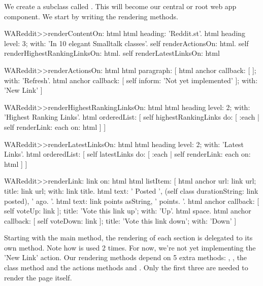 \documentclass[a4paper,10pt,twoside]{book}
\begin{document}
We create a  subclass called . This will become our central or root web app component. We start by writing the rendering methods.

\begin{code}{}
WAReddit>>renderContentOn: html
    html heading: 'Reddit.st'. 
    html heading level: 3; with: 'In 10 elegant Smalltalk classes'. 
    self renderActionsOn: html. 
    self renderHighestRankingLinksOn: html. 
    self renderLatestLinksOn: html
\end{code}

\begin{code}{}
WAReddit>>renderActionsOn: html
    html paragraph: [ html anchor callback: [ ]; with: 'Refresh'. 
    html anchor callback: [ self inform: 'Not yet implemented' ]; with: 'New Link' ]
\end{code}

\begin{code}{}
WAReddit>>renderHighestRankingLinksOn: html
    html heading level: 2; with: 'Highest Ranking Links'. 
    html orderedList: [
          self highestRankingLinks do: [ :each | self renderLink: each on: html ] ]
\end{code}

\begin{code}{}
WAReddit>>renderLatestLinksOn: html
    html heading level: 2; with: 'Latest Links'. 
    html orderedList: [
         self latestLinks do: [ :each | self renderLink: each on: html ] ]
\end{code}

\begin{code}{}
WAReddit>>renderLink: link on: html
    html listItem: [ html anchor url: link url; title: link url; with: link title.   
    html text: ' Posted ', (self class durationString: link posted), ' ago. '. 
    html text: link points asString, ' points. '. 
    html anchor 
         callback: [ self voteUp: link ]; 
         title: 'Vote this link up'; 
         with: 'Up'. 
    html space. 
    html anchor 
         callback: [ self voteDown: link ]; 
         title: 'Vote this link down'; with: 'Down' ]
\end{code}

Starting with the main  method, the rendering of each section is delegated to its own method. Note how  is used 2 times. For now, we're not yet implementing the 'New Link' action. Our rendering methods depend on 5 extra methods: , , the class method  and the actions methods  and . Only the first three are needed to render the page itself.
\end{document}
